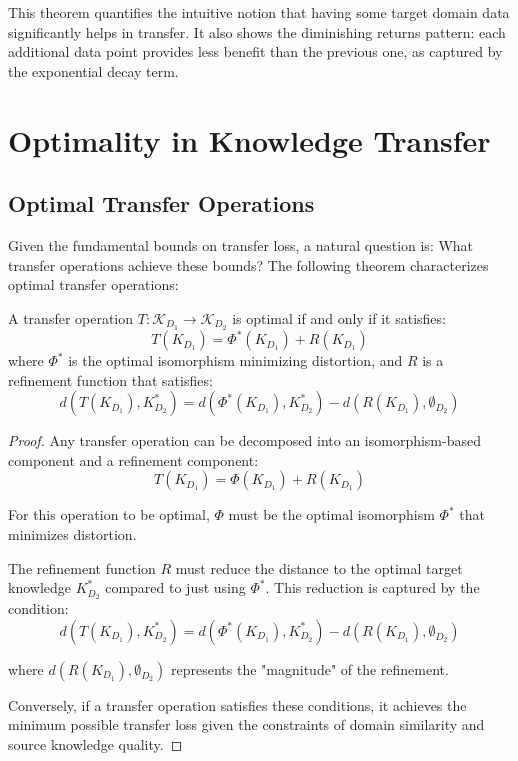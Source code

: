 This theorem quantifies the intuitive notion that having some target domain data significantly helps in transfer. It also shows the diminishing returns pattern: each additional data point provides less benefit than the previous one, as captured by the exponential decay term.

\section{Optimality in Knowledge Transfer}

\subsection{Optimal Transfer Operations}

Given the fundamental bounds on transfer loss, a natural question is: What transfer operations achieve these bounds? The following theorem characterizes optimal transfer operations:

\begin{theorem}
A transfer operation $T: \mathcal{K}_{D_1} \to \mathcal{K}_{D_2}$ is optimal if and only if it satisfies:
\begin{equation}
T(K_{D_1}) = \Phi^*(K_{D_1}) + R(K_{D_1})
\end{equation}
where $\Phi^*$ is the optimal isomorphism minimizing distortion, and $R$ is a refinement function that satisfies:
\begin{equation}
d(T(K_{D_1}), K_{D_2}^*) = d(\Phi^*(K_{D_1}), K_{D_2}^*) - d(R(K_{D_1}), \emptyset_{D_2})
\end{equation}
\end{theorem}

\begin{proof}
Any transfer operation can be decomposed into an isomorphism-based component and a refinement component:
\begin{equation}
T(K_{D_1}) = \Phi(K_{D_1}) + R(K_{D_1})
\end{equation}

For this operation to be optimal, $\Phi$ must be the optimal isomorphism $\Phi^*$ that minimizes distortion.

The refinement function $R$ must reduce the distance to the optimal target knowledge $K_{D_2}^*$ compared to just using $\Phi^*$. This reduction is captured by the condition:
\begin{equation}
d(T(K_{D_1}), K_{D_2}^*) = d(\Phi^*(K_{D_1}), K_{D_2}^*) - d(R(K_{D_1}), \emptyset_{D_2})
\end{equation}

where $d(R(K_{D_1}), \emptyset_{D_2})$ represents the "magnitude" of the refinement.

Conversely, if a transfer operation satisfies these conditions, it achieves the minimum possible transfer loss given the constraints of domain similarity and source knowledge quality.
\end{proof}

